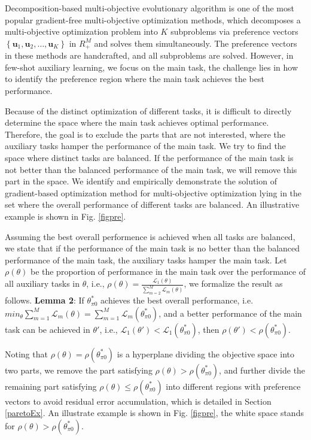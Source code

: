 \documentclass[final]{cvpr}
\begin{document}
Decomposition-based multi-objective evolutionary algorithm \cite{TrivediSSG17,ZhangL07} is one of the most popular gradient-free multi-objective optimization methods, which decomposes a multi-objective optimization problem into $K$ subproblems via preference vectors $\left\{\boldsymbol{u}_{1}, \boldsymbol{u}_{2}, \ldots, \boldsymbol{u}_{K}\right\}$ in $R_{+}^{M}$ and solves them simultaneously. The preference vectors in these methods are handcrafted, and all subproblems are solved.
However, in few-shot auxiliary learning, we focus on the main task, the challenge lies in how to identify the preference region where the main task achieves the best performance. 

Because of the distinct optimization of different tasks, it is difficult to directly determine the space where the main task achieves optimal performance.
Therefore, the goal is to exclude the parts that are not interested, where the auxiliary tasks hamper the performance of the main task.
We try to find the space where distinct tasks are balanced.
If the performance of the main task is not better than the balanced performance of the main task, we will remove this part in the space.
We identify and empirically demonstrate the solution of gradient-based optimization method for multi-objective optimization lying in the set where the overall performance of different tasks are balanced.  
An illustrative example is shown in Fig. \ref{figpre}.

 
Assuming the best overall performence is achieved when all tasks are balanced, we state that if the performance of the main task is no better than the balanced performance of the main task, the auxiliary tasks hamper the main task. Let $\rho(\theta)$ be the proportion of performance in the main task over the performance of all auxiliary tasks in $\theta$, i.e., $\rho(\theta) = \frac{\mathcal{L}_1(\theta) }{\sum_{m=2}^{M} \mathcal{L}_m(\theta) } $, we formalize the result as follows.
\textbf{Lemma 2}: If $\theta_{\pi0}^{*}$ achieves the best overall performance, i.e. $min_{\theta} \sum_{m=1}^{M} \mathcal{L}_m(\theta) = \sum_{m=1}^{M} \mathcal{L}_m(\theta_{\pi0}^{*})$, and a better performance of the main task can be achieved in $\theta'$, i.e., $ \mathcal{L}_1(\theta') < \mathcal{L}_1(\theta_{\pi0}^{*})$,  then $\rho(\theta') < \rho(\theta_{\pi0}^{*}) $.
 
Noting that $\rho(\theta) = \rho(\theta_{\pi0}^{*}) $ is a hyperplane dividing the objective space into two parts, we remove the part satisfying $\rho(\theta) > \rho(\theta_{\pi0}^{*}) $, and further divide the remaining part satisfying $\rho(\theta) \leq \rho(\theta_{\pi0}^{*}) $ into different regions with preference vectors to avoid residual error accumulation, which is detailed in Section \ref{paretoEx}. An illustrate example is shown in Fig. \ref{figpre}, the white space stands for $\rho(\theta) > \rho(\theta_{\pi0}^{*})$.
\end{document}
